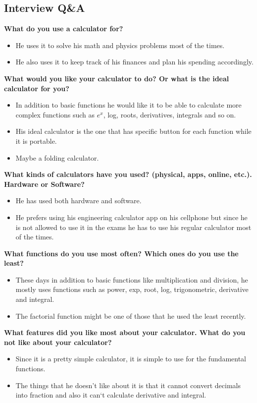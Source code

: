 \documentclass{article}
\begin{document}
\subsection*{Interview Q\&A}
\textbf{What do you use a calculator for?}
\begin{itemize}
\itemsep0em 
\item He uses it to solve his math and physics problems most of the times. 
\item He also uses it to keep track of his finances and plan his spending accordingly.
\end{itemize}

\textbf{What would you like your calculator to do? Or what is the ideal calculator for you?}
\begin{itemize}
\itemsep0em 
\item In addition to basic functions he would like it to be able to calculate more complex functions such as $e^x$, log, roots, derivatives, integrals and so on.
\item His ideal calculator is the one that has specific button for each function while it is portable. 
\item Maybe a folding calculator.
\end{itemize}

\textbf{What kinds of calculators have you used? (physical, apps, online, etc.). Hardware or Software?}
\begin{itemize}
\itemsep0em 
\item He has used both hardware and software. 
\item He prefers using his engineering calculator app on his cellphone but since he is not allowed to use it in the exams he has to use his regular calculator most of the times.
\end{itemize}

\textbf{What functions do you use most often? Which ones do you use the least?}
\begin{itemize}
\itemsep0em 
\item These days in addition to basic functions like multiplication and division, he mostly uses functions such as power, exp, root, log, trigonometric, derivative and integral. 
\item The factorial function might be one of those that he used the least recently.
\end{itemize}

\textbf{What features did you like most about your calculator. What do you not like about your calculator?}
\begin{itemize}
\itemsep0em 
\item Since it is a pretty simple calculator, it is simple to use for the fundamental functions. 
\item The things that he doesn't like about it is that it cannot convert decimals into fraction and also it can`t calculate derivative and integral.
\end{itemize}
\end{document}
